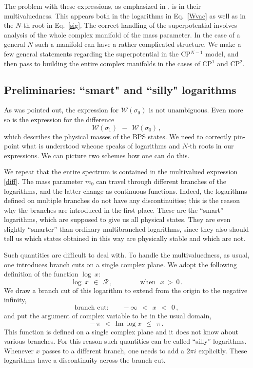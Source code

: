 \documentclass[epsfig,12pt]{article}
\def\beq{\begin{equation}}
\def\eeq{\end{equation}}
\def\beq{\begin{equation}}
\def\eeq{\end{equation}}
\newcommand{\mc}[1]{\mathcal{#1}}
\begin{document}
	The problem with these expressions, as emphasized in \cite{Bolokhov:2011mp}, is in their 
	multiva\-luedness.
	This appears both in the logarithms in Eq.~\eqref{Wvac} as well as in the $ N $-th root in Eq.~\eqref{sig}.
	The correct handling of the superpotential involves analysis of the whole complex manifold
	of the mass parameter.
	In the case of a general $ N $ such a manifold can have a rather complicated structure.
	We make a few general statements regarding the superpotential in the CP$^{N-1}$ model, and then pass
	to building the entire complex manifolds in the cases of 
	CP$^1$ and CP$^2$.

\subsection{Preliminaries: ``smart" and ``silly" logarithms}

	As was pointed out, the expression for $ \mc{W}(\sigma_0) $ is not unambiguous.
	Even more so is the expression for the difference
\beq
\label{diff}
	\mc{W}(\sigma_1) ~~-~~ \mc{W}(\sigma_0)\,,
\eeq
	which describes the physical masses of the BPS states.
	We need to correctly pin-point what is understood wheone speaks of logarithms 
	and $ N $-th roots in our expressions.
	We can picture two schemes how one can do this. 

	We repeat that the entire spectrum is contained in the multivalued expression \eqref{diff}.
	The mass parameter $ m_0 $ can travel through different branches of the logarithms, and
	the latter change as continuous functions.
	Indeed, the logarithms defined on multiple branches do not have any discontinuities;
	this is the reason why the branches are introduced in the first place. 
	These are the ``smart'' logarithms, which are supposed to give us all physical states. 
	They are even slightly ``smarter'' than ordinary multibranched logarithms, since they also should tell us
	which states  obtained in this way are physically stable and which are not. 

	Such quantities are   difficult to deal with. 
		To handle the multivaluedness, as usual,  one introduces branch cuts on a single complex plane. 
	We adopt the following definition of the function $ \log~x $:
\beq
	\log~x ~~\in~~ \mc{R}\,, \qquad\qquad \text{when~~} x ~>~ 0\,.
\eeq
	We draw a branch cut of this logarithm to extend from the origin to the negative infinity,
\beq
	\text{branch cut:}\qquad -\infty ~~<~~ x ~~<~~ 0\,,
\eeq
	and put the argument of complex variable to be in the usual domain,
\beq
	-\,\pi ~~<~~  \text{Im}~\log x  ~~\leq~~ \pi\,.
\eeq
	This function is defined on a single complex plane and it does not know about various branches.
	For this reason such quantities can be called ``silly'' logarithms.
	Whenever $ x $ passes to a different branch, one needs to add a $ 2 \pi i $ explicitly.
	These logarithms have a discontinuity across the branch cut.
\end{document}
